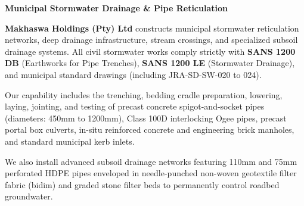 \hypertarget{sec:stormwater}{}

\noindent
\begin{minipage}[t]{0.62\textwidth}
    \vspace{0pt}
    {\large\bfseries\color{mhnavy} Municipal Stormwater Drainage \& Pipe Reticulation}
    \vspace{0.12cm}

    {\fontsize{9pt}{13pt}\selectfont\color{mhtext}
    \textbf{Makhaswa Holdings (Pty) Ltd} constructs municipal stormwater reticulation networks, deep drainage infrastructure, stream crossings, and specialized subsoil drainage systems. All civil stormwater works comply strictly with \textbf{SANS 1200 DB} (Earthworks for Pipe Trenches), \textbf{SANS 1200 LE} (Stormwater Drainage), and municipal standard drawings (including JRA-SD-SW-020 to 024).
    }

    \vspace{0.22cm}

    {\fontsize{9pt}{13pt}\selectfont\color{mhtext}
    Our capability includes the trenching, bedding cradle preparation, lowering, laying, jointing, and testing of precast concrete spigot-and-socket pipes (diameters: 450mm to 1200mm), Class 100D interlocking Ogee pipes, precast portal box culverts, in-situ reinforced concrete and engineering brick manholes, and standard municipal kerb inlets.
    }

    \vspace{0.22cm}

    {\fontsize{9pt}{13pt}\selectfont\color{mhtext}
    We also install advanced subsoil drainage networks featuring 110mm and 75mm perforated HDPE pipes enveloped in needle-punched non-woven geotextile filter fabric (bidim) and graded stone filter beds to permanently control roadbed groundwater.
    }
\end{minipage}
\hfill
